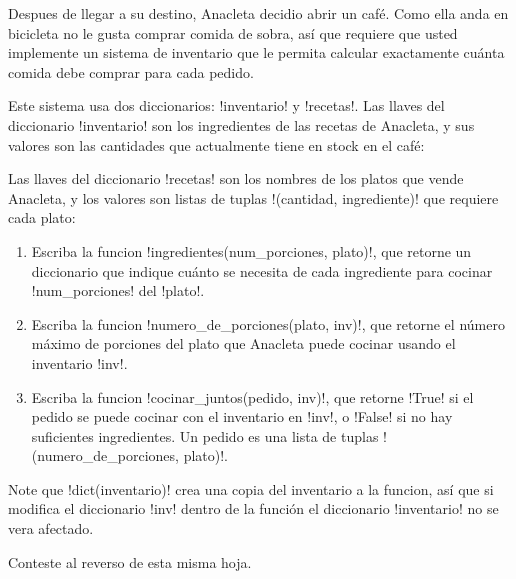 Despues de llegar a su destino,
Anacleta decidio abrir un café.
Como ella anda en bicicleta
no le gusta comprar comida de sobra,
así que requiere que usted implemente un sistema de inventario
que le permita calcular exactamente
cuánta comida debe comprar para cada pedido.

Este sistema usa dos diccionarios: \li!inventario! y \li!recetas!.
Las llaves del diccionario \li!inventario!
son los ingredientes de las recetas de Anacleta,
y sus valores son las cantidades que actualmente tiene en stock en el café:


Las llaves del diccionario \li!recetas!
son los nombres de los platos que vende Anacleta,
y los valores son listas de tuplas \li!(cantidad, ingrediente)!
que requiere cada plato:


\begin{enumerate}[leftmargin=0pt,label=\emph{\alph*})]

  \item
    Escriba la funcion \li!ingredientes(num_porciones, plato)!,
    que retorne un diccionario que indique
    cuánto se necesita de cada ingrediente
    para cocinar \li!num_porciones! del \li!plato!.
    

  \item
    Escriba la funcion \li!numero_de_porciones(plato, inv)!,
    que retorne el número máximo de porciones del plato
    que Anacleta puede cocinar usando el inventario \li!inv!.
    

  \item
    Escriba la funcion \li!cocinar_juntos(pedido, inv)!,
    que retorne \li!True! si el pedido se puede cocinar
    con el inventario en \li!inv!,
    o \li!False! si no hay suficientes ingredientes.
    Un pedido es una lista de tuplas \li!(numero_de_porciones, plato)!.
    

\end{enumerate}

Note que \li!dict(inventario)! crea
una copia del inventario a la funcion,
así que si modifica el diccionario \li!inv! dentro de la función
el diccionario \li!inventario! no se vera afectado.

Conteste al reverso de esta misma hoja.

